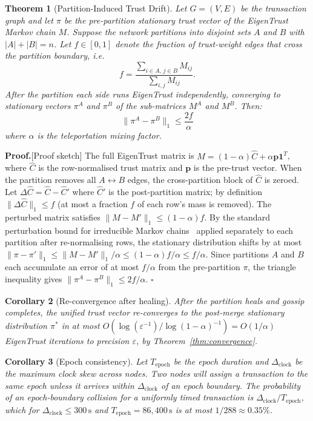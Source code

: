 \documentclass[11pt]{article}
\newtheorem{theorem}{Theorem}[section]
\newtheorem{corollary}[theorem]{Corollary}
\newcommand{\qed}{\hfill}
\newenvironment{proof}{\noindent\textbf{Proof.}}{\qed$\square$\par\medskip}
\begin{document}
\begin{theorem}[Partition-Induced Trust Drift]\label{thm:partition_drift}
Let $G = (V, E)$ be the transaction graph and let $\pi$ be the pre-partition stationary trust vector of the EigenTrust Markov chain $M$. Suppose the network partitions into disjoint sets $A$ and $B$ with $|A| + |B| = n$. Let $f \in [0,1]$ denote the fraction of trust-weight edges that cross the partition boundary, i.e.\
\[
    f = \frac{\sum_{i \in A,\, j \in B} M_{ij}}{\sum_{i,j} M_{ij}}.
\]
After the partition each side runs EigenTrust independently, converging to stationary vectors $\pi^A$ and $\pi^B$ of the sub-matrices $M^A$ and $M^B$. Then:
\[
    \|\pi^A - \pi^B\|_1 \leq \frac{2f}{\alpha}
\]
where $\alpha$ is the teleportation mixing factor.
\end{theorem}
\begin{proof}[Proof sketch]
The full EigenTrust matrix is $M = (1-\alpha)\hat{C} + \alpha \mathbf{p}\mathbf{1}^T$, where $\hat{C}$ is the row-normalised trust matrix and $\mathbf{p}$ is the pre-trust vector. When the partition removes all $A \leftrightarrow B$ edges, the cross-partition block of $\hat{C}$ is zeroed. Let $\Delta\hat{C} = \hat{C} - \hat{C}'$ where $\hat{C}'$ is the post-partition matrix; by definition $\|\Delta\hat{C}\|_1 \leq f$ (at most a fraction $f$ of each row's mass is removed). The perturbed matrix satisfies $\|M - M'\|_1 \leq (1-\alpha)f$. By the standard perturbation bound for irreducible Markov chains~\cite[Theorem~2.1]{seneta1979} applied separately to each partition after re-normalising rows, the stationary distribution shifts by at most $\|\pi - \pi'\|_1 \leq \|M - M'\|_1 / \alpha \leq (1-\alpha)f/\alpha \leq f/\alpha$. Since partitions $A$ and $B$ each accumulate an error of at most $f/\alpha$ from the pre-partition $\pi$, the triangle inequality gives $\|\pi^A - \pi^B\|_1 \leq 2f/\alpha$.
\end{proof}

\begin{corollary}[Re-convergence after healing]\label{cor:healing}
After the partition heals and gossip completes, the unified trust vector re-converges to the post-merge stationary distribution $\pi^*$ in at most $O\!\left(\log(\varepsilon^{-1}) / \log(1-\alpha)^{-1}\right) = O(1/\alpha)$ EigenTrust iterations to precision $\varepsilon$, by Theorem~\ref{thm:convergence}.
\end{corollary}

\begin{corollary}[Epoch consistency]\label{cor:epoch_consistency}
Let $T_{\text{epoch}}$ be the epoch duration and $\Delta_{\text{clock}}$ be the maximum clock skew across nodes. Two nodes will assign a transaction to the same epoch unless it arrives within $\Delta_{\text{clock}}$ of an epoch boundary. The probability of an epoch-boundary collision for a uniformly timed transaction is $\Delta_{\text{clock}} / T_{\text{epoch}}$, which for $\Delta_{\text{clock}} \leq 300\,\mathrm{s}$ and $T_{\text{epoch}} = 86{,}400\,\mathrm{s}$ is at most $1/288 \approx 0.35\%$.
\end{corollary}
\end{document}
